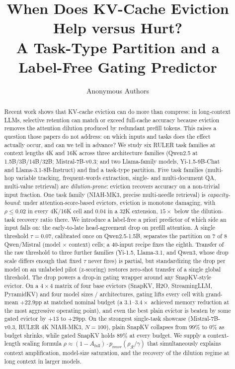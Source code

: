 \documentclass{article}
\title{When Does KV-Cache Eviction Help versus Hurt?\\
A Task-Type Partition and a Label-Free Gating Predictor}
\author{%
  Anonymous Authors%
}
\begin{document}
\maketitle

\begin{abstract}
Recent work shows that KV-cache eviction can do more than compress: in long-context
LLMs, selective retention can match or exceed full-cache accuracy because eviction
removes the attention dilution produced by redundant prefill tokens. This raises a
question those papers do not address: on which inputs and tasks does the effect
actually occur, and can we tell in advance? We study six RULER task families at
context lengths 4K and 16K across three architecture families (Qwen2.5 at
1.5B/3B/14B/32B; Mistral-7B-v0.3; and two Llama-family models, Yi-1.5-9B-Chat and
Llama-3.1-8B-Instruct) and find a task-type partition. Five task families
(multi-hop variable tracking, frequent-words extraction, single- and
multi-document QA, multi-value retrieval) are \emph{dilution-prone}: eviction
recovers accuracy on a non-trivial input fraction. One task family (NIAH-MK3,
precise multi-needle retrieval) is \emph{capacity-bound}: under
attention-score-based evictors, eviction is monotone damaging, with $\rho \le
0.02$ in every 4K/16K cell and $0.04$ in a 32K extension, $15\times$ below
the dilution-task recovery ratio there. We introduce a label-free a priori predictor of which
side an input falls on: the early-to-late head-agreement drop on prefill attention.
A single threshold $\tau = 0.07$, calibrated once on Qwen2.5-1.5B, separates the
partition on $7$ of $8$ Qwen/Mistral (model $\times$ context) cells; a
$40$-input recipe fixes the eighth. Transfer of the raw threshold to
three further families (Yi-1.5, Llama-3.1, and Qwen3, whose drop scale
differs enough that fixed $\tau$ never fires) is partial, but
standardizing the drop per model on an unlabeled pilot (z-scoring)
restores zero-shot transfer of a single global threshold. The drop powers
a drop-in gating wrapper
around any SnapKV-style evictor. On a $4 \times 4$ matrix of four base evictors
(SnapKV, H2O, StreamingLLM, PyramidKV) and four model sizes / architectures, gating
lifts every cell with grand-mean $+22.9$pp at matched nominal budget
(a $3.1$--$3.4\times$ achieved memory reduction at the most aggressive
operating point), and even the
best plain evictor is beaten by some gated evictor by $+13$ to $+29$pp. On the
strongest single-task showcase (Mistral-7B-v0.3, RULER 4K NIAH-MK3, $N=100$),
plain SnapKV collapses from $99\%$ to $0\%$ as budget shrinks, while gated SnapKV
holds $89\%$ at every budget. We supply a context-length scaling formula
$\rho \approx (1 - A_{\mathrm{full}}) \cdot p_{\mathrm{recov}}(\rho_{\mathcal R} / \gamma)$
that simultaneously explains context amplification, model-size saturation, and
the recovery of the dilution regime at long context in larger models.
\end{abstract}
\end{document}
